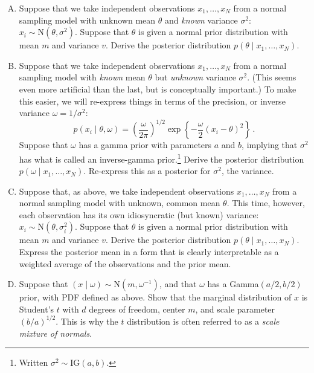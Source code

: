 \documentclass{mynotes}
\newcommand{\N}{\mbox{N}}
\begin{document}
\begin{enumerate}[(A)]
\item Suppose that we take independent observations $x_1, \ldots, x_N$ from a normal sampling model with unknown mean $\theta$ and \textit{known} variance $\sigma^2$: $x_i \sim \mbox{N}(\theta, \sigma^2)$.  Suppose that $\theta$ is given a normal prior distribution with mean $m$ and variance $v$.  Derive the posterior distribution $p(\theta \mid x_1, \ldots, x_N)$.

\item Suppose that we take independent observations $x_1, \ldots, x_N$ from a normal sampling model with \textit{known} mean $\theta$ but \textit{unknown} variance $\sigma^2$.  (This seems even more artificial than the last, but is conceptually important.)  To make this easier, we will re-express things in terms of the precision, or inverse variance $\omega = 1/\sigma^2$:
$$
p(x_i \mid \theta, \omega) = \left( \frac{\omega}{2 \pi} \right)^{1/2} \exp \left\{ -\frac{\omega}{2} (x_i - \theta)^2 \right\} \, .
$$
Suppose that $\omega$ has a gamma prior with parameters $a$ and $b$, implying that $\sigma^2$ has what is called an inverse-gamma prior.\footnote{Written $\sigma^2 \sim \mbox{IG}(a,b)$.}  Derive the posterior distribution $p(\omega \mid x_1, \ldots, x_N)$.  Re-express this as a posterior for $\sigma^2$, the variance.

\item Suppose that, as above, we take independent observations $x_1, \ldots, x_N$ from a normal sampling model with unknown, common mean $\theta$.  This time, however, each observation has its own idiosyncratic (but known) variance: $x_i \sim \mbox{N}(\theta, \sigma_i^2)$.  Suppose that $\theta$ is given a normal prior distribution with mean $m$ and variance $v$.  Derive the posterior distribution $p(\theta \mid x_1, \ldots, x_N)$.  Express the posterior mean in a form that is clearly interpretable as a weighted average of the observations and the prior mean.

\item Suppose that $(x \mid \omega) \sim \N(m, \omega^{-1})$, and that $\omega$ has a Gamma$(a/2, b/2)$ prior, with PDF defined as above.  Show that the marginal distribution of $x$ is Student's $t$ with $d$ degrees of freedom, center $m$, and scale parameter $(b/a)^{1/2}$.  This is why the $t$ distribution is often referred to as a \textit{scale mixture of normals}.

\end{enumerate}
\end{document}
